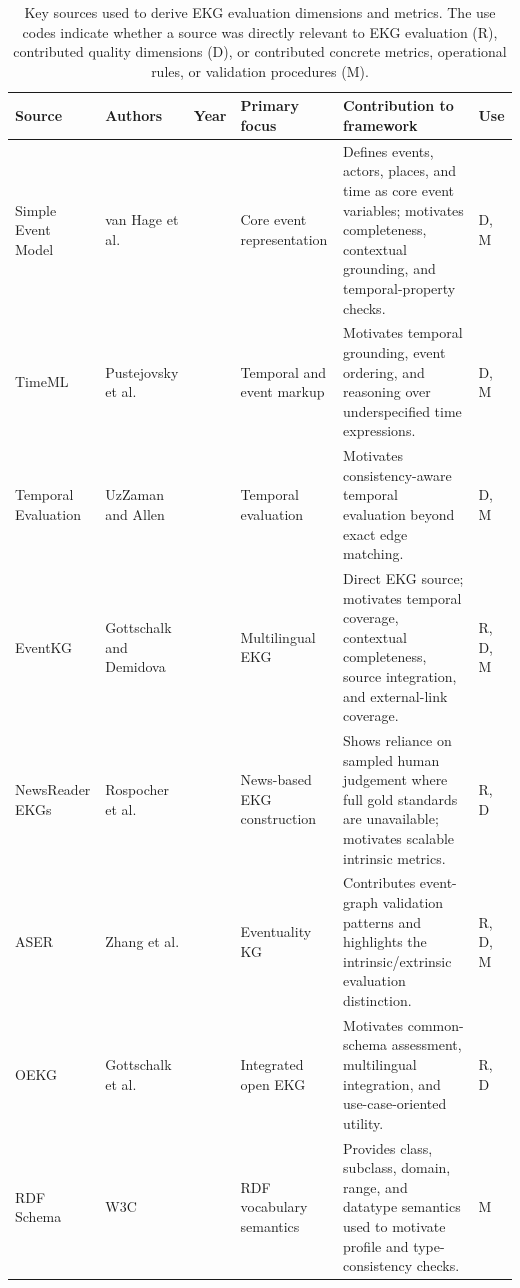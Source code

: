 \begin{table}[htbp]
\centering
\scriptsize
\caption{Key sources used to derive EKG evaluation dimensions and metrics. The use codes indicate whether a source was directly relevant to EKG evaluation (R), contributed quality dimensions (D), or contributed concrete metrics, operational rules, or validation procedures (M).}
\label{tab:key_ekg_eval_papers}
\setlength{\tabcolsep}{3pt}
\begin{tabularx}{\textwidth}{>{\raggedright\arraybackslash}p{2.4cm}>{\raggedright\arraybackslash}p{1.9cm}>{\raggedright\arraybackslash}p{0.7cm}>{\raggedright\arraybackslash}p{2.0cm}X>{\raggedright\arraybackslash}p{0.8cm}}
\toprule
\textbf{Source} & \textbf{Authors} & \textbf{Year} & \textbf{Primary focus} & \textbf{Contribution to framework} & \textbf{Use} \\
\midrule
Simple Event Model \citep{sem2011} & van Hage et al. & 2011 & Core event representation & Defines events, actors, places, and time as core event variables; motivates completeness, contextual grounding, and temporal-property checks. & D, M \\
TimeML \citep{timeml2003} & Pustejovsky et al. & 2005 & Temporal and event markup & Motivates temporal grounding, event ordering, and reasoning over underspecified time expressions. & D, M \\
Temporal Evaluation \citep{tempeval2011} & UzZaman and Allen & 2011 & Temporal evaluation & Motivates consistency-aware temporal evaluation beyond exact edge matching. & D, M \\
EventKG \citep{eventkg2018} & Gottschalk and Demidova & 2018 & Multilingual EKG & Direct EKG source; motivates temporal coverage, contextual completeness, source integration, and external-link coverage. & R, D, M \\
NewsReader EKGs \citep{newsreader2016} & Rospocher et al. & 2016 & News-based EKG construction & Shows reliance on sampled human judgement where full gold standards are unavailable; motivates scalable intrinsic metrics. & R, D \\
ASER \citep{aser2019} & Zhang et al. & 2020 & Eventuality KG & Contributes event-graph validation patterns and highlights the intrinsic/extrinsic evaluation distinction. & R, D, M \\
OEKG \citep{oekg2023} & Gottschalk et al. & 2021 & Integrated open EKG & Motivates common-schema assessment, multilingual integration, and use-case-oriented utility. & R, D \\
RDF Schema \citep{rdfs2014} & W3C & 2014 & RDF vocabulary semantics & Provides class, subclass, domain, range, and datatype semantics used to motivate profile and type-consistency checks. & M \\

\end{tabularx}
\end{table}

